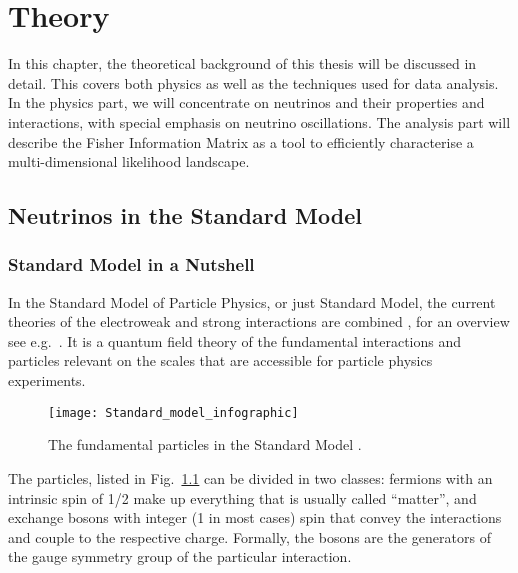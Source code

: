 \chapter{Theory}
\label{sec:theory}

In this chapter, the theoretical background of this thesis will be discussed
in detail. This covers both physics as well as the techniques used for data
analysis. In the physics part, we will concentrate on neutrinos and their
properties and interactions, with special emphasis on neutrino oscillations.
The analysis part will describe the Fisher Information Matrix as a tool to
efficiently characterise a multi-dimensional likelihood landscape.

\section{Neutrinos in the Standard Model}
\label{sec:nus}


\subsection{Standard Model in a Nutshell}
\label{sec:NusInSM}

In the Standard Model of Particle Physics, or just Standard Model, the current
theories of the electroweak and strong interactions are combined
\cite{SMGlashow, SMWeinberg, SMSalam, SMtHooft}, for an overview see e.g.\
\cite{SMtextbook}. It is a quantum field theory of the fundamental interactions
and particles relevant on the scales that are accessible for particle physics
experiments.

\begin{figure}
\centering
  \texttt{[image: Standard\_model\_infographic]}
\caption{The fundamental particles in the Standard Model \cite{SMchart}.}
\label{fig:SMchart}
\end{figure}

The particles, listed in Fig.~\ref{fig:SMchart} can be divided in two classes:
fermions with an intrinsic spin of 1/2 make up everything that is usually called
``matter'', and exchange bosons with integer (1 in most cases) spin that convey
the interactions and couple to the respective charge. Formally, the bosons are
the generators of the gauge symmetry group of the particular interaction.

